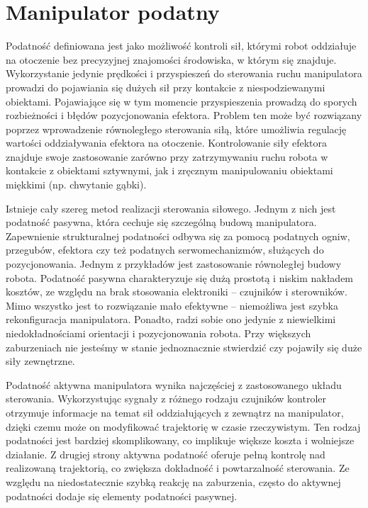 \documentclass[printmode]{mgr}
\begin{document}
\section{Manipulator podatny}
Podatność \cite{handbook} definiowana jest jako możliwość kontroli sił, którymi robot oddziałuje
na otoczenie bez precyzyjnej znajomości środowiska, w którym się znajduje. Wykorzystanie jedynie prędkości i przyspieszeń
do sterowania ruchu manipulatora prowadzi do pojawiania się dużych sił przy kontakcie z niespodziewanymi obiektami. Pojawiające się
w tym momencie przyspieszenia prowadzą do sporych rozbieżności i błędów pozycjonowania efektora. Problem ten może być
rozwiązany poprzez wprowadzenie równoległego sterowania siłą, które umożliwia regulację wartości oddziaływania efektora
na otoczenie. Kontrolowanie siły efektora znajduje swoje zastosowanie zarówno przy zatrzymywaniu ruchu robota w kontakcie z
obiektami sztywnymi, jak i zręcznym manipulowaniu obiektami miękkimi (np. chwytanie gąbki).

Istnieje cały szereg metod realizacji sterowania siłowego. Jednym z nich jest podatność pasywna, która cechuje się
szczególną budową manipulatora. Zapewnienie strukturalnej podatności odbywa się za pomocą podatnych ogniw, przegubów, efektora
czy też podatnych serwomechanizmów, służących do pozycjonowania. Jednym z przykładów jest zastosowanie
równoległej budowy robota. Podatność pasywna charakteryzuje się dużą prostotą i niskim nakładem kosztów, ze względu na
brak stosowania elektroniki -- czujników i sterowników. Mimo wszystko jest to rozwiązanie mało efektywne -- niemożliwa jest
szybka rekonfiguracja manipulatora. Ponadto, radzi sobie ono jedynie z niewielkimi niedokładnościami orientacji i pozycjonowania robota.
Przy większych zaburzeniach nie jesteśmy w stanie jednoznacznie stwierdzić czy pojawiły się duże siły zewnętrzne.

Podatność aktywna manipulatora wynika najczęściej z zastosowanego układu sterowania. Wykorzystując sygnały z
różnego rodzaju czujników kontroler otrzymuje informacje na temat sił oddziałujących z zewnątrz na manipulator, dzięki
czemu może on modyfikować trajektorię w czasie rzeczywistym. Ten rodzaj podatności jest bardziej skomplikowany,
co implikuje większe koszta i wolniejsze działanie. Z drugiej strony aktywna podatność oferuje pełną kontrolę nad
realizowaną trajektorią, co zwiększa dokładność i powtarzalność sterowania. Ze względu na niedostatecznie szybką reakcję
na zaburzenia, często do aktywnej podatności dodaje się elementy podatności pasywnej.
\end{document}
